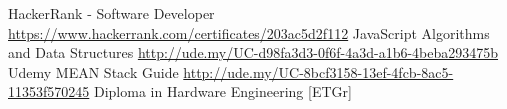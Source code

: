 
\begin{scholarship}
                    {HackerRank - Software Developer \url{https://www.hackerrank.com/certificates/203ac5d2f112}}
					{JavaScript Algorithms and Data Structures  \url{http://ude.my/UC-d98fa3d3-0f6f-4a3d-a1b6-4beba293475b}}
					{ Udemy MEAN Stack Guide  \url{http://ude.my/UC-8bcf3158-13ef-4fcb-8ac5-11353f570245}}
					{Diploma in Hardware Engineering [ETGr]}
\end{scholarship}